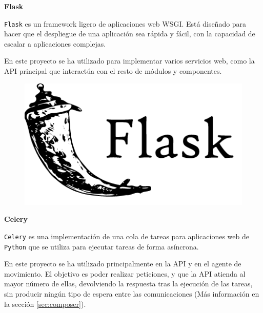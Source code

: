 \textbf{Flask}

\texttt{Flask} \cite{ref14} es un framework ligero de aplicaciones web WSGI. Está diseñado para hacer que el despliegue de una aplicación sea rápida y fácil, con la capacidad de escalar a aplicaciones complejas.

En este proyecto se ha utilizado para implementar varios servicios web, como la API principal que interactúa con el resto de módulos y componentes.

\begin{figure}[h]
	\centering
	\includegraphics[scale=0.19]{images/13}
\end{figure}

\textbf{Celery}

\texttt{Celery} \cite{ref15} es una implementación de una cola de tareas para aplicaciones web de \texttt{Python} que se utiliza para ejecutar tareas de forma asíncrona.

En este proyecto se ha utilizado principalmente en la API y en el agente de movimiento. El objetivo es poder realizar peticiones, y que la API atienda al mayor número de ellas, devolviendo la respuesta tras la ejecución de las tareas, sin producir ningún tipo de espera entre las comunicaciones (Más información en la sección \ref{sec:composer}).

\vspace{-0.6cm}

